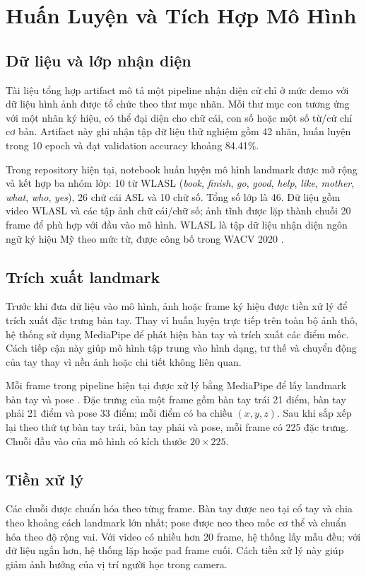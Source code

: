 \documentclass[conference]{IEEEtran}
\begin{document}
\section{Huấn Luyện và Tích Hợp Mô Hình}
\subsection{Dữ liệu và lớp nhận diện}
Tài liệu tổng hợp artifact mô tả một pipeline nhận diện cử chỉ ở mức demo với dữ liệu hình ảnh được tổ chức theo thư mục nhãn. Mỗi thư mục con tương ứng với một nhãn ký hiệu, có thể đại diện cho chữ cái, con số hoặc một số từ/cử chỉ cơ bản. Artifact này ghi nhận tập dữ liệu thử nghiệm gồm 42 nhãn, huấn luyện trong 10 epoch và đạt validation accuracy khoảng 84.41\%.

Trong repository hiện tại, notebook huấn luyện mô hình landmark được mở rộng và kết hợp ba nhóm lớp: 10 từ WLASL (\textit{book}, \textit{finish}, \textit{go}, \textit{good}, \textit{help}, \textit{like}, \textit{mother}, \textit{what}, \textit{who}, \textit{yes}), 26 chữ cái ASL và 10 chữ số. Tổng số lớp là 46. Dữ liệu gồm video WLASL và các tập ảnh chữ cái/chữ số; ảnh tĩnh được lặp thành chuỗi 20 frame để phù hợp với đầu vào mô hình. WLASL là tập dữ liệu nhận diện ngôn ngữ ký hiệu Mỹ theo mức từ, được công bố trong WACV 2020 \cite{wlasl}.

\subsection{Trích xuất landmark}
Trước khi đưa dữ liệu vào mô hình, ảnh hoặc frame ký hiệu được tiền xử lý để trích xuất đặc trưng bàn tay. Thay vì huấn luyện trực tiếp trên toàn bộ ảnh thô, hệ thống sử dụng MediaPipe để phát hiện bàn tay và trích xuất các điểm mốc. Cách tiếp cận này giúp mô hình tập trung vào hình dạng, tư thế và chuyển động của tay thay vì nền ảnh hoặc chi tiết không liên quan.

Mỗi frame trong pipeline hiện tại được xử lý bằng MediaPipe để lấy landmark bàn tay và pose \cite{mediapipe}. Đặc trưng của một frame gồm bàn tay trái 21 điểm, bàn tay phải 21 điểm và pose 33 điểm; mỗi điểm có ba chiều $(x,y,z)$. Sau khi sắp xếp lại theo thứ tự bàn tay trái, bàn tay phải và pose, mỗi frame có 225 đặc trưng. Chuỗi đầu vào của mô hình có kích thước $20 \times 225$.

\subsection{Tiền xử lý}
Các chuỗi được chuẩn hóa theo từng frame. Bàn tay được neo tại cổ tay và chia theo khoảng cách landmark lớn nhất; pose được neo theo mốc cơ thể và chuẩn hóa theo độ rộng vai. Với video có nhiều hơn 20 frame, hệ thống lấy mẫu đều; với dữ liệu ngắn hơn, hệ thống lặp hoặc pad frame cuối. Cách tiền xử lý này giúp giảm ảnh hưởng của vị trí người học trong camera.
\end{document}
